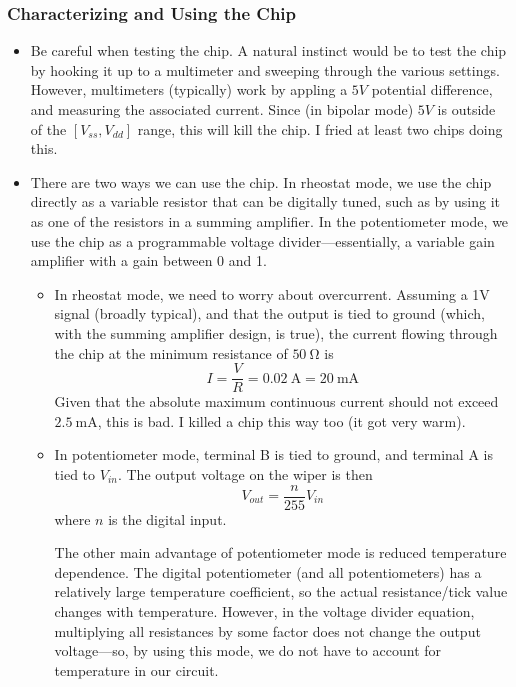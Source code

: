 \documentclass{article}
\begin{document}
        \subsubsection*{Characterizing and Using the Chip}
        \begin{itemize}
            \item Be careful when testing the chip. A natural instinct would be to test the chip by hooking it up to a multimeter and sweeping through the various settings. However, multimeters (typically) work by appling a $5V$ potential difference, and measuring the associated current. Since (in bipolar mode) $5V$ is outside of the $[V_{ss}, V_{dd}]$ range, this will kill the chip. I fried at least two chips doing this.
            \item There are two ways we can use the chip. In rheostat mode, we use the chip directly as a variable resistor that can be digitally tuned, such as by using it as one of the resistors in a summing amplifier. In the potentiometer mode, we use the chip as a programmable voltage divider---essentially, a variable gain amplifier with a gain between 0 and 1.
            \begin{itemize}
                \item In rheostat mode, we need to worry about overcurrent. Assuming a 1V signal (broadly typical), and that the output is tied to ground (which, with the summing amplifier design, is true), the current flowing through the chip at the minimum resistance of $\SI{50}{\ohm}$ is
                \begin{equation*}
                    I = \frac{V}{R} = \SI{0.02}{\A} = \SI{20}{\milli\A}
                \end{equation*}
                Given that the absolute maximum continuous current should not exceed $\SI{2.5}{\milli\A}$, this is bad. I killed a chip this way too (it got very warm).
                \item In potentiometer mode, terminal B is tied to ground, and terminal A is tied to $V_{in}$. The output voltage on the wiper is then
                \begin{equation*}
                    V_{out} = \frac{n}{255}V_{in}
                \end{equation*}
                where $n$ is the digital input.

                The other main advantage of potentiometer mode is reduced temperature dependence. The digital potentiometer (and all potentiometers) has a relatively large temperature coefficient, so the actual resistance/tick value changes with temperature. However, in the voltage divider equation, multiplying all resistances by some factor does not change the output voltage---so, by using this mode, we do not have to account for temperature in our circuit.
            \end{itemize}
        \end{itemize}
\end{document}
